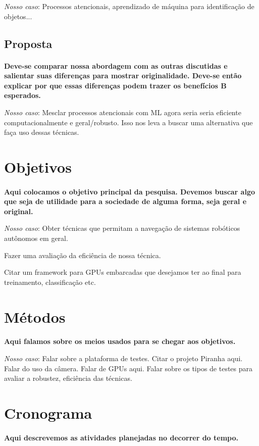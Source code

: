 \documentclass[11pt]{article}
\newcommand{\tit}[1]{\textit{#1}}
\newcommand{\tbf}[1]{\textbf{#1}}
\begin{document}
\tit{Nosso caso}:
Processos atencionais, aprendizado de máquina para identificação de objetos...

\subsection{Proposta}
\paragraph{}
\tbf{Deve-se comparar nossa abordagem com as outras discutidas e salientar suas
diferenças para mostrar originalidade.
Deve-se então explicar por que essas diferenças podem trazer os benefícios 
B esperados.}

\tit{Nosso caso}:
Mesclar processos atencionais com ML agora seria  
seria eficiente computacionalmente e geral/robusto. 
Isso nos leva a buscar uma alternativa que faça uso dessas técnicas.

\section{Objetivos}
\paragraph{}
\tbf{Aqui colocamos o objetivo principal da pesquisa. Devemos buscar algo que
seja de utilidade para a sociedade de alguma forma, seja geral e original.}

\tit{Nosso caso}:
Obter técnicas que permitam a navegação de sistemas robóticos autônomos 
em geral.

Fazer uma avaliação da eficiência de nossa técnica.

Citar um framework para GPUs embarcadas que desejamos ter ao final para 
treinamento, classificação etc.

\section{Métodos}
\paragraph{}
\tbf{Aqui falamos sobre os meios usados para se chegar aos objetivos.}

\tit{Nosso caso}:
Falar sobre a plataforma de testes. 
Citar o projeto Piranha aqui. 
Falar do uso da câmera. Falar de GPUs aqui. 
Falar sobre os tipos de testes para avaliar a robustez, eficiência das técnicas.

\section{Cronograma}
\paragraph{}
\tbf{Aqui descrevemos as atividades planejadas no decorrer do tempo.}



\end{document}
